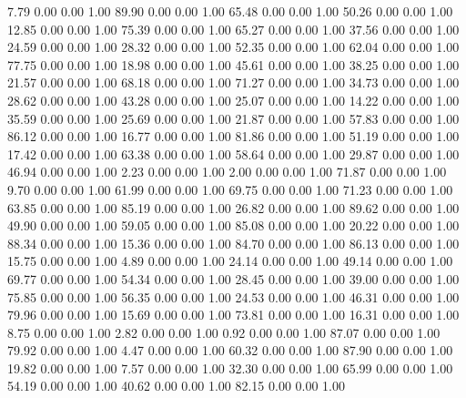     7.79   0.00   0.00   1.00
   89.90   0.00   0.00   1.00
   65.48   0.00   0.00   1.00
   50.26   0.00   0.00   1.00
   12.85   0.00   0.00   1.00
   75.39   0.00   0.00   1.00
   65.27   0.00   0.00   1.00
   37.56   0.00   0.00   1.00
   24.59   0.00   0.00   1.00
   28.32   0.00   0.00   1.00
   52.35   0.00   0.00   1.00
   62.04   0.00   0.00   1.00
   77.75   0.00   0.00   1.00
   18.98   0.00   0.00   1.00
   45.61   0.00   0.00   1.00
   38.25   0.00   0.00   1.00
   21.57   0.00   0.00   1.00
   68.18   0.00   0.00   1.00
   71.27   0.00   0.00   1.00
   34.73   0.00   0.00   1.00
   28.62   0.00   0.00   1.00
   43.28   0.00   0.00   1.00
   25.07   0.00   0.00   1.00
   14.22   0.00   0.00   1.00
   35.59   0.00   0.00   1.00
   25.69   0.00   0.00   1.00
   21.87   0.00   0.00   1.00
   57.83   0.00   0.00   1.00
   86.12   0.00   0.00   1.00
   16.77   0.00   0.00   1.00
   81.86   0.00   0.00   1.00
   51.19   0.00   0.00   1.00
   17.42   0.00   0.00   1.00
   63.38   0.00   0.00   1.00
   58.64   0.00   0.00   1.00
   29.87   0.00   0.00   1.00
   46.94   0.00   0.00   1.00
    2.23   0.00   0.00   1.00
    2.00   0.00   0.00   1.00
   71.87   0.00   0.00   1.00
    9.70   0.00   0.00   1.00
   61.99   0.00   0.00   1.00
   69.75   0.00   0.00   1.00
   71.23   0.00   0.00   1.00
   63.85   0.00   0.00   1.00
   85.19   0.00   0.00   1.00
   26.82   0.00   0.00   1.00
   89.62   0.00   0.00   1.00
   49.90   0.00   0.00   1.00
   59.05   0.00   0.00   1.00
   85.08   0.00   0.00   1.00
   20.22   0.00   0.00   1.00
   88.34   0.00   0.00   1.00
   15.36   0.00   0.00   1.00
   84.70   0.00   0.00   1.00
   86.13   0.00   0.00   1.00
   15.75   0.00   0.00   1.00
    4.89   0.00   0.00   1.00
   24.14   0.00   0.00   1.00
   49.14   0.00   0.00   1.00
   69.77   0.00   0.00   1.00
   54.34   0.00   0.00   1.00
   28.45   0.00   0.00   1.00
   39.00   0.00   0.00   1.00
   75.85   0.00   0.00   1.00
   56.35   0.00   0.00   1.00
   24.53   0.00   0.00   1.00
   46.31   0.00   0.00   1.00
   79.96   0.00   0.00   1.00
   15.69   0.00   0.00   1.00
   73.81   0.00   0.00   1.00
   16.31   0.00   0.00   1.00
    8.75   0.00   0.00   1.00
    2.82   0.00   0.00   1.00
    0.92   0.00   0.00   1.00
   87.07   0.00   0.00   1.00
   79.92   0.00   0.00   1.00
    4.47   0.00   0.00   1.00
   60.32   0.00   0.00   1.00
   87.90   0.00   0.00   1.00
   19.82   0.00   0.00   1.00
    7.57   0.00   0.00   1.00
   32.30   0.00   0.00   1.00
   65.99   0.00   0.00   1.00
   54.19   0.00   0.00   1.00
   40.62   0.00   0.00   1.00
   82.15   0.00   0.00   1.00
